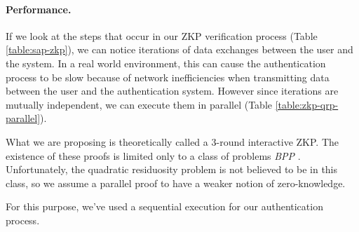 \paragraph{Performance.}
If we look at the steps that occur in our ZKP verification process (Table \ref{table:sap-zkp}), we can notice iterations of data exchanges between the user and the system.
In a real world environment, this can cause the authentication process to be slow because of network inefficiencies when transmitting data between the user and the authentication system.
However since iterations are mutually independent, we can execute them in parallel (Table \ref{table:zkp-qrp-parallel}).

\begin{table*}[h!]
	\centering
	\caption{Parallel ZKP Construction}
	\label{table:zkp-qrp-parallel}
\end{table*}

What we are proposing is theoretically called a 3-round interactive ZKP.
The existence of these proofs is limited only to a class of problems \textit{BPP} \cite{goldreich1996composition}.
Unfortunately, the quadratic residuosity problem is not believed to be in this class, so we assume a parallel proof to have a weaker notion of zero-knowledge.

For this purpose, we've used a sequential execution for our authentication process.